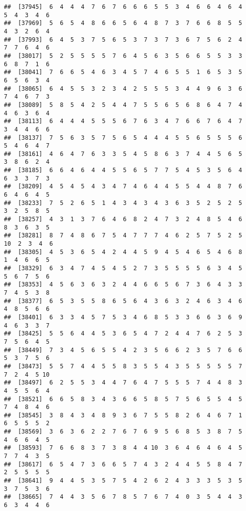 \documentclass[
]{book}
\begin{document}
\begin{verbatim}
##  [37945]  6  4  4  4  7  6  7  6  6  6  5  5  3  4  6  6  4  6  4  5  4  3  4  6
##  [37969]  5  6  5  4  8  6  6  5  6  4  8  7  3  7  6  6  8  5  5  4  3  2  6  4
##  [37993]  6  4  5  3  7  5  6  5  3  7  3  7  3  6  7  5  6  2  4  7  7  6  4  6
##  [38017]  5  2  5  5  5  5  7  6  4  5  6  3  5  6  6  5  5  3  3  6  8  7  1  6
##  [38041]  7  6  6  5  4  6  3  4  5  7  4  6  5  5  1  6  5  3  5  6  5  6  3  4
##  [38065]  6  4  5  5  3  2  3  4  2  5  5  5  3  4  4  9  6  3  6  7  4  6  7  3
##  [38089]  5  8  5  4  2  5  4  4  7  5  5  6  5  6  8  6  4  7  4  4  6  3  6  4
##  [38113]  6  4  4  4  5  5  5  6  7  6  3  4  7  6  6  7  6  4  7  3  4  4  6  6
##  [38137]  7  5  6  3  5  7  5  6  5  4  4  4  5  5  6  5  5  5  6  5  4  6  4  7
##  [38161]  4  6  4  7  6  3  3  5  4  5  8  6  3  7  4  4  5  6  5  3  8  6  2  4
##  [38185]  6  6  4  6  4  4  5  5  6  5  7  7  5  4  5  3  5  6  4  6  3  3  7  3
##  [38209]  4  5  4  5  4  3  4  7  4  6  4  4  5  5  4  4  8  7  6  6  4  6  4  5
##  [38233]  7  5  2  6  5  1  4  3  4  3  4  3  6  3  5  2  5  2  5  3  2  5  8  5
##  [38257]  4  3  1  3  7  6  4  6  8  2  4  7  3  2  4  8  5  4  6  8  3  6  3  5
##  [38281]  8  7  4  8  6  7  5  4  7  7  7  4  6  2  5  7  5  2  5 10  2  3  4  6
##  [38305]  4  5  3  6  5  4  2  4  4  5  9  4  5  4  6  5  4  6  8  1  4  6  6  5
##  [38329]  6  3  4  7  4  5  4  5  2  7  3  5  5  5  5  6  3  4  5  5  6  7  5  6
##  [38353]  4  5  6  3  6  3  2  4  4  6  6  5  6  7  3  6  4  3  3  7  4  5  3  8
##  [38377]  6  5  3  5  5  8  6  5  6  4  3  6  3  2  4  6  3  4  6  4  8  5  6  6
##  [38401]  6  3  3  4  5  7  5  3  4  6  8  5  3  3  6  6  3  6  9  4  6  3  3  7
##  [38425]  5  5  6  4  4  5  3  6  5  4  7  2  4  4  7  6  2  5  3  7  5  6  4  5
##  [38449]  7  3  4  5  6  5  5  4  2  3  5  6  6  2  3  5  7  6  6  5  3  7  5  6
##  [38473]  5  5  7  4  4  5  5  8  3  5  5  4  3  5  5  5  5  5  7  7  2  4  5 10
##  [38497]  6  2  5  5  3  4  4  7  6  4  7  5  5  5  7  4  4  8  3  4  5  5  6  4
##  [38521]  6  6  5  8  3  4  3  6  6  5  8  5  7  5  6  5  5  4  5  7  4  8  4  6
##  [38545]  3  8  4  3  4  8  9  3  6  7  5  5  8  2  6  4  6  7  1  6  5  5  5  2
##  [38569]  3  6  3  6  2  2  7  6  7  6  9  5  6  8  5  3  8  7  5  4  6  6  4  5
##  [38593]  7  6  6  8  3  7  3  8  4  4 10  3  6  4  6  4  6  4  5  7  7  4  3  5
##  [38617]  6  5  4  7  3  6  6  5  7  4  3  2  4  4  5  5  8  4  7  2  5  5  5  5
##  [38641]  9  4  4  5  3  5  7  5  4  2  6  2  4  3  3  3  5  3  5  3  7  5  3  6
##  [38665]  7  4  4  3  5  6  7  8  5  7  6  7  4  0  3  5  4  4  3  6  3  4  4  6

\end{verbatim}
\end{document}
